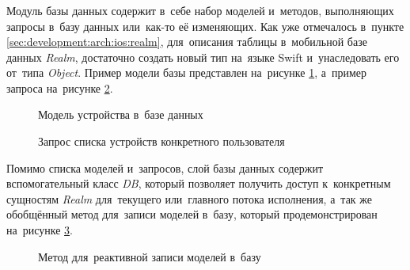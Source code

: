\subsubsection{}
\label{sec:development:client:db}

Модуль базы данных содержит в~себе набор моделей и~методов, выполняющих запросы в~базу данных или~как-то её изменяющих. 
Как уже отмечалось в~пункте \ref{sec:development:arch:ios:realm}, для~описания таблицы в~мобильной базе данных \textit{Realm}, достаточно создать новый тип на~языке Swift и~унаследовать его от~типа \textit{Object}. Пример модели базы представлен на~рисунке \ref{sec:development:client:db:code:model}, а~пример запроса на~рисунке \ref{sec:development:client:db:code:query}.

\begin{figure}[h]
	
   \caption{Модель устройства в~базе данных}
   \label{sec:development:client:db:code:model}
\end{figure}

\begin{figure}[h]
	
   \caption{Запрос списка устройств конкретного пользователя}
   \label{sec:development:client:db:code:query}
\end{figure}

Помимо списка моделей и~запросов, слой базы данных содержит вспомогательный класс \textit{DB}, который позволяет получить доступ к~конкретным сущностям \textit{Realm} для~текущего или~главного потока исполнения, а~так же обобщённый метод для~записи моделей в~базу, который продемонстрирован на~рисунке \ref{sec:development:client:db:code:util}.

\begin{figure}[h]
	
   \caption{Метод для~реактивной записи моделей в~базу}
   \label{sec:development:client:db:code:util}
\end{figure}